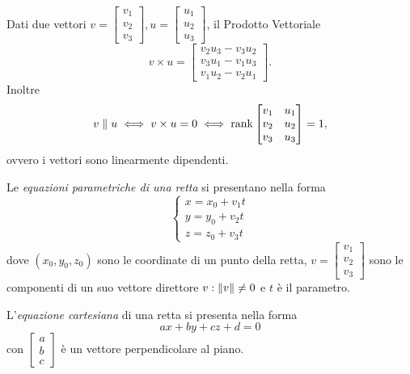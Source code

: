 \begin{appendices}
\begin{definition}
	Dati due vettori $ v = \begin{bmatrix} v_1 \\ v_2 \\ v_3 \end{bmatrix},  u = \begin{bmatrix} u_1 \\ u_2 \\ u_3 \end{bmatrix} $, il Prodotto Vettoriale
	\[ v \times u = \begin{bmatrix}
		v_2 u_3 - v_3 u_2 \\
		v_3 u_1 - v_1 u_3 \\
		v_1 u_2 - v_2 u_1
	\end{bmatrix}. \]
	Inoltre
	\[ v \parallel u \iff v \times u = 0 \iff \operatorname{rank} \begin{bmatrix} v_1 & u_1 \\ v_2 & u_2 \\ v_3 & u_3 \end{bmatrix} = 1, \]
	ovvero i vettori sono linearmente dipendenti.
\end{definition}

\par
Le \emph{equazioni parametriche di una retta} si presentano nella forma
\[
	\begin{cases}
		x = x_0 + v_1 t\\
		y = y_0 + v_2 t\\
		z = z_0 + v_3 t
	\end{cases}	
\]
dove $ (x_0, y_0, z_0) $ sono le coordinate di un punto della retta,
$ v = \begin{bmatrix} v_1 \\ v_2 \\ v_3 \end{bmatrix} $ sono le componenti di un suo vettore direttore $ v : \left\|v\right\| \neq 0 $ e $t$ è il parametro.

\par
L'\emph{equazione cartesiana} di una retta si presenta nella forma
\[ ax + by + cz + d = 0 \]
con $ \begin{bmatrix} a \\ b \\ c \end{bmatrix} $ è un vettore perpendicolare al piano.


\end{appendices}
